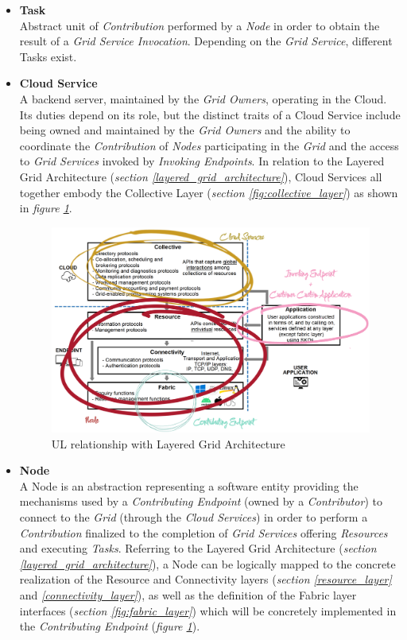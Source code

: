 \begin{itemize}
    \item \textbf{Task}\label{task}\\
    Abstract unit of \textit{Contribution} performed by a \textit{Node} in order to obtain the result of a \textit{Grid Service Invocation}. Depending on the \textit{Grid Service}, different Tasks exist.
    \item \textbf{Cloud Service}\label{cloud_service}\\
    A backend server, maintained by the \textit{Grid Owners}, operating in the Cloud. Its duties depend on its role, but the distinct traits of a Cloud Service include being owned and maintained by the \textit{Grid Owners} and the ability to coordinate the \textit{Contribution} of \textit{Nodes} participating in the \textit{Grid} and the access to \textit{Grid Services} invoked by \textit{Invoking Endpoints}. In relation to the Layered Grid Architecture (\textit{section \ref{layered_grid_architecture}}), Cloud Services all together embody the Collective Layer (\textit{section \ref{fig:collective_layer}}) as shown in \textit{figure \ref{fig:layered_grid_architecture_and_ul}}.
    \begin{figure}[!ht]
        \centering
        \includegraphics[width=\linewidth]{document/chapters/chapter_4/images/layered_grid_architecture_and_ul.png}
        \caption{UL relationship with Layered Grid Architecture}
        \label{fig:layered_grid_architecture_and_ul}
    \end{figure}
    \item \textbf{Node}\label{node}\\
    A Node is an abstraction representing a software entity providing the mechanisms used by a \textit{Contributing Endpoint} (owned by a \textit{Contributor}) to connect to the \textit{Grid} (through the \textit{Cloud Services}) in order to perform a \textit{Contribution} finalized to the completion of \textit{Grid Services} offering \textit{Resources} and executing \textit{Tasks}. Referring to the Layered Grid Architecture (\textit{section \ref{layered_grid_architecture}}), a Node can be logically mapped to the concrete realization of the Resource and Connectivity layers (\textit{section \ref{resource_layer}} and \textit{\ref{connectivity_layer}}), as well as the definition of the Fabric layer interfaces (\textit{section \ref{fig:fabric_layer}}) which will be concretely implemented in the \textit{Contributing Endpoint} (\textit{figure \ref{fig:layered_grid_architecture_and_ul}}).

\end{itemize}
